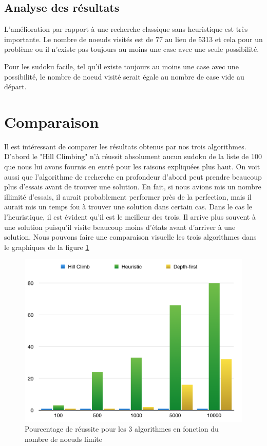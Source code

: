 \documentclass[a4paper,10pt]{article}
\begin{document}
\subsection{Analyse des résultats}

L'amélioration par rapport à une recherche classique sans heuristique est très importante. Le nombre de noeuds visités est de 77 au lieu de 5313 et cela pour un problème ou il n'existe pas toujours au moins une case avec une seule possibilité.

Pour les sudoku facile, tel qu'il existe toujours au moins une case avec une possibilité, le nombre de noeud visité serait égale au nombre de case vide au départ.


\section{Comparaison}
Il est intéressant de comparer les résultats obtenus par nos trois algorithmes. D'abord le "Hill Climbing" n'à réussit absolument aucun sudoku de la liste de 100 que nous lui avons fournis en entré pour les raisons expliquées plus haut. On voit aussi que l'algorithme de recherche en profondeur d'abord peut prendre beaucoup plus d'essais avant de trouver une solution. En fait, si nous avions mis un nombre illimité d'essais, il aurait probablement performer près de la perfection, mais il aurait mis un temps fou à trouver une solution dans certain cas. Dans le cas le l'heuristique, il est évident qu'il est le meilleur des trois. Il arrive plus souvent à une solution puisqu'il visite beaucoup moins d'états avant d'arriver à une solution. Nous pouvons faire une comparaison visuelle les trois algorithmes dans le graphiques de la figure \ref{fig:comp} \\

\begin{figure}[H]
	\includegraphics[width=12cm]{images/comparaison.png} 
	\centering
	\caption{Pourcentage de réussite pour les 3 algorithmes en fonction du nombre de noeuds limite}
	\label{fig:comp}
\end{figure}
\end{document}
